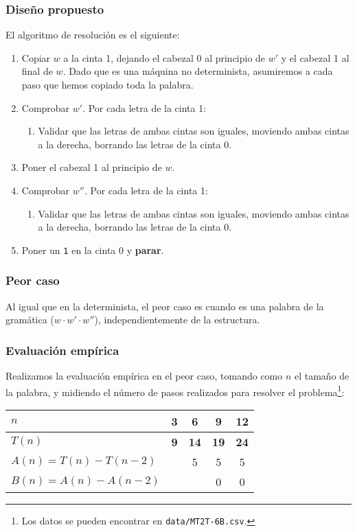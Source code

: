\subsubsection*{Diseño propuesto}
El algoritmo de resolución es el siguiente:

\begin{enumerate}
    \item Copiar $w$ a la cinta 1, dejando el cabezal 0 al principio de $w'$ y el cabezal 1 al final de $w$. Dado que es una máquina no determinista, asumiremos a cada paso que hemos copiado toda la palabra.
    \item Comprobar $w'$. Por cada letra de la cinta 1:
    \begin{enumerate}[1.]
        \item Validar que las letras de ambas cintas son iguales, moviendo ambas cintas a la derecha, borrando las letras de la cinta 0.
    \end{enumerate}
    \item Poner el cabezal 1 al principio de $w$.
    \item Comprobar $w''$. Por cada letra de la cinta 1:
    \begin{enumerate}[1.]
        \item Validar que las letras de ambas cintas son iguales, moviendo ambas cintas a la derecha, borrando las letras de la cinta 0.
    \end{enumerate}
    \item Poner un \texttt{1} en la cinta 0 y \textbf{parar}.
\end{enumerate}



\subsubsection*{Peor caso}
Al igual que en la determinista, el peor caso es cuando es una palabra de la gramática ($w \cdot w' \cdot w''$), independientemente de la estructura.


\subsubsection*{Evaluación empírica}
Realizamos la evaluación empírica en el peor caso, tomando como $n$ el tamaño de la palabra, y midiendo el número de pasos realizados para resolver el problema\footnote{Los datos se pueden encontrar en \texttt{data/MT2T-6B.csv}.}:

\begin{table}[H]
    \centering
    \begin{tabular}{|l|c|c|c|c|}
        \hline
        $n$    & \textbf{3} & \textbf{6}  & \textbf{9}  & \textbf{12} \\ \hline
        $T(n)$ & \textbf{9} & \textbf{14} & \textbf{19} & \textbf{24} \\ \hline
        \hline
        $A(n) = T(n) - T(n-2)$ &   & 5 & 5 & 5 \\ \hline
        $B(n) = A(n) - A(n-2)$ &   &   & 0 & 0 \\ \hline
    \end{tabular}
\end{table}

